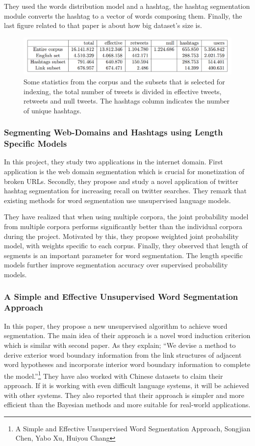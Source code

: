 \documentclass[12pt]{comjnl}
\begin{document}
They used the words distribution model and a hashtag, the hashtag segmentation module converts the hashtag to a vector of words composing them. Finally, the last figure related to that paper is about how big dataset's size is.

\begin{figure}[htbp]
\centering
\includegraphics[width=7in]{paper1.png}
\caption{Some statistics from the corpus and the subsets that is selected for indexing,
the total number of tweets is divided in effective tweets, retweets and null tweets. 
The hashtags column indicates the number of unique hashtags.}\label{fig:paper1}
\end{figure}

\subsubsection{Segmenting Web-Domains and Hashtags using Length Specific Models}
In this project, they study two applications in the internet domain. First application
is the web domain segmentation which is crucial for monetization
of broken URLs. Secondly, they propose and study a novel application of twitter hashtag 
segmentation for increasing recall on twitter searches. They remark that existing methods for
word segmentation use unsupervised language models. 

They have realized that when using multiple corpora, the joint probability model from multiple corpora performs significantly better
than the individual corpora during the project. Motivated by this, they propose
weighted joint probability model, with weights specific
to each corpus. Finally, they observed that length of segments is an important parameter for word segmentation.
The length specific models further improve segmentation accuracy
over supervised probability models.

\subsubsection{A Simple and Effective Unsupervised Word Segmentation Approach}
In this paper, they propose a new unsupervised algorithm to achieve word segmentation. The main idea of their approach
is a novel word induction criterion which is similar with second paper. As they explain; ``We devise a method
to derive exterior word boundary information from the
link structures of adjacent word hypotheses and incorporate
interior word boundary information to complete
the model.''\footnote{A Simple and Effective Unsupervised Word Segmentation Approach, Songjian Chen, Yabo Xu, Huiyou Chang}
They have also worked with Chinese datasets to claim their approach. If it is working with even difficult language systems, it will be achieved with other systems. They also reported that their approach is simpler and more efficient than the Bayesian methods and more suitable for real-world applications.
\end{document}
